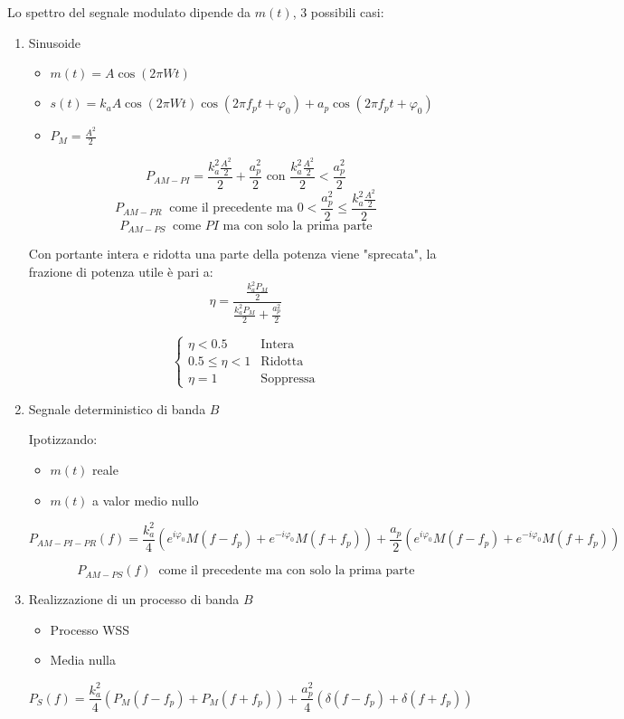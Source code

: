 \documentclass{article}
\begin{document}
\noindent Lo spettro del segnale modulato dipende da $m(t)$, 3 possibili casi:
\begin{enumerate}
    \item Sinusoide
        \begin{itemize}
            \item $m(t)=A\cos(2\pi Wt)$
            \item $s(t)=k_aA\cos(2\pi Wt)\cos(2\pi f_pt+\varphi_0)+a_p\cos(2\pi f_pt+\varphi_0)$
            \item $P_M=\frac{A^2}{2}$
        \end{itemize}

        $$P_{AM-PI}=\frac{k_a^2\frac{A^2}{2}}{2}+\frac{a_p^2}{2} \text{ con }\frac{k_a^2\frac{A^2}{2}}{2}<\frac{a_p^2}{2}$$
        $$P_{AM-PR}\ \text{ come il precedente ma } 0<\frac{a_p^2}{2}\leq\frac{k_a^2\frac{A^2}{2}}{2}$$
        $$P_{AM-PS}\ \text{ come $PI$ ma con solo la prima parte}$$

    Con portante intera e ridotta una parte della potenza viene "sprecata", la frazione di potenza utile è pari a:
    $$\eta=\frac{\displaystyle\frac{k_a^2P_M}{2}}{\displaystyle\frac{k_a^2P_M}{2}+\frac{a_p^2}{2}}$$

    \[\begin{cases}
        \eta<0.5 & \text{Intera}\\
        0.5\leq\eta<1 & \text{Ridotta}\\
        \eta=1 & \text{Soppressa}
    \end{cases}\]

    \newpage
    
    \item Segnale deterministico di banda $B$
    
        Ipotizzando:
        \begin{itemize}
            \item $m(t)$ reale
            \item $m(t)$ a valor medio nullo
        \end{itemize}

        $$P_{AM-PI-PR}(f)=\frac{k_a^2}{4}(e^{i\varphi_0}M(f-f_p)+e^{-i\varphi_0}M(f+f_p))+\frac{a_p}{2}(e^{i\varphi_0}M(f-f_p)+e^{-i\varphi_0}M(f+f_p))$$

        $$P_{AM-PS}(f)\ \text{ come il precedente ma con solo la prima parte}$$
    
    \item Realizzazione di un processo di banda $B$
        \begin{itemize}
            \item Processo WSS
            \item Media nulla
        \end{itemize}

        $$P_S(f)=\frac{k_a^2}{4}(P_M(f-f_p)+P_M(f+f_p))+\frac{a_p^2}{4}(\delta(f-f_p)+\delta(f+f_p))$$\newline
    
\end{enumerate}
\end{document}
